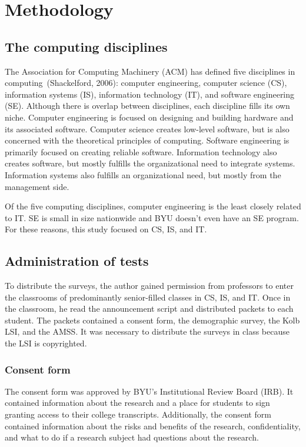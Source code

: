 \chapter{Methodology}\label{chp:chapter3}
\section{The computing disciplines}
The Association for Computing Machinery (ACM) has defined five disciplines in com\-put\-ing~(Shackelford, 2006): computer engineering, computer science (CS), information systems (IS), information technology (IT), and software engineering (SE). Although there is overlap between disciplines, each discipline fills its own niche. Computer engineering is focused on designing and building hardware and its associated software. Computer science creates low-level software, but is also concerned with the theoretical principles of computing. Software engineering is primarily focused on creating reliable software. Information technology also creates software, but mostly fulfills the organizational need to integrate systems. Information systems also fulfills an organizational need, but mostly from the management side.

Of the five computing disciplines, computer engineering is the least closely related to IT. SE is small in size nationwide and BYU doesn't even have an SE program. For these reasons, this study focused on CS, IS, and IT.

\section{Administration of tests}
To distribute the surveys, the author gained permission from professors to enter the classrooms of predominantly senior-filled classes in CS, IS, and IT. Once in the classroom, he read the announcement script and distributed packets to each student. The packets contained a consent form, the demographic survey, the Kolb LSI, and the AMSS. It was necessary to distribute the surveys in class because the LSI is copyrighted.

\subsection{Consent form}
The consent form was approved by BYU's Institutional Review Board (IRB). It contained information about the research and a place for students to sign granting access to their college transcripts. Additionally, the consent form contained information about the risks and benefits of the research, confidentiality, and what to do if a research subject had questions about the research.

